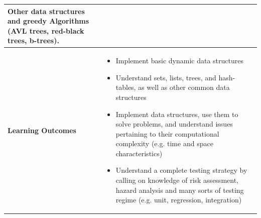 \documentclass{article}
\begin{document}
\begin{longtable}{|p{3cm}|p{10cm}|}
Other data structures and greedy Algorithms
(AVL trees, red-black trees, b-trees).\\
\hline
\textbf{Learning Outcomes} & 
    \begin{itemize}
        \item Implement basic dynamic data structures
        \item Understand sets, lists, trees, and hash-tables, as well as other common data structures
        \item Implement data structures, use them to solve problems, and understand issues pertaining to their computational complexity (e.g. time and space characteristics)
        \item Understand a complete testing strategy by calling on knowledge of risk assessment, hazard analysis and many sorts of testing regime (e.g. unit, regression, integration)
    \end{itemize} \\
\hline
\end{longtable}
\end{document}
